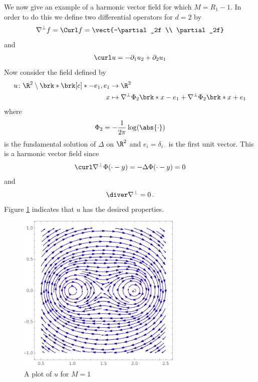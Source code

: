 We now give an example of a harmonic vector field
for which $M=R_1-1$. In order to do this we define two differential operators for $d=2$ by
\begin{align*}
  \nabla^\perp f=\Curl f=\vect{-\partial_2f \\ \partial_2f}
\end{align*}
and
\begin{align*}
  \curl u=-\partial_1u_2+\partial_2u_1
\end{align*}
Now consider the field defined by
\begin{align*}
  u\colon\R^2\setminus\brk*{\brk[c]*{-e_1,e_1}}&\to\R^2 \\
  x&\mapsto\nabla^\perp\Phi_2\brk*{x-e_1}+\nabla^\perp\Phi_2\brk*{x+e_1}
\end{align*}
where
\begin{align*}
  \Phi_2=-\frac{1}{2\pi}\log(\abs{\cdot})
\end{align*}
is the fundamental solution of $\Delta$ on $\R^2$ and $e_i=\delta_{i\cdot}$ is the first unit vector.
This is a harmonic vector field since
\begin{align*}
  \curl \nabla^\perp \Phi(\cdot-y)= -\Delta \Phi(\cdot-y)=0
\end{align*}
and
\begin{align*}
  \diver \nabla^\perp =0\,.
\end{align*}
Figure \ref{pl:n2_hvf_noInflowNoOutflow} indicates that $u$ has the desired properties.
\begin{figure}
  \centering
  \includegraphics[width=0.7\textwidth]{../Plots/n2_hvf_noInflowNoOutflow_asymmetric.pdf}
  \caption{A plot of $u$ for $M=1$ }
  \label{pl:n2_hvf_noInflowNoOutflow}
\end{figure}

